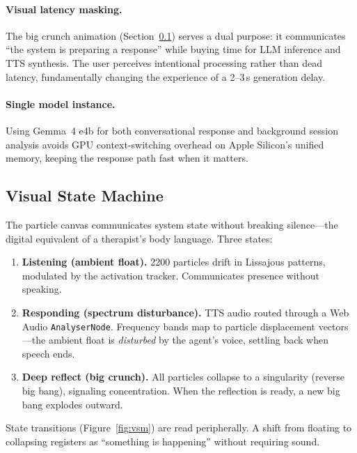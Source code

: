 \documentclass{article}
\begin{document}
\paragraph{Visual latency masking.} The big crunch animation (Section~\ref{sec:vsm}) serves a dual purpose: it communicates ``the system is preparing a response'' while buying time for LLM inference and TTS synthesis. The user perceives intentional processing rather than dead latency, fundamentally changing the experience of a 2--3\,s generation delay.

\paragraph{Single model instance.} Using Gemma~4 e4b for both conversational response and background session analysis avoids GPU context-switching overhead on Apple Silicon's unified memory, keeping the response path fast when it matters.

\subsection{Visual State Machine}
\label{sec:vsm}

The particle canvas communicates system state without breaking silence---the digital equivalent of a therapist's body language. Three states:

\begin{enumerate}
\item \textbf{Listening (ambient float).} 2200 particles drift in Lissajous patterns, modulated by the activation tracker. Communicates presence without speaking.
\item \textbf{Responding (spectrum disturbance).} TTS audio routed through a Web Audio \texttt{AnalyserNode}. Frequency bands map to particle displacement vectors---the ambient float is \emph{disturbed} by the agent's voice, settling back when speech ends.
\item \textbf{Deep reflect (big crunch).} All particles collapse to a singularity (reverse big bang), signaling concentration. When the reflection is ready, a new big bang explodes outward.
\end{enumerate}

State transitions (Figure~\ref{fig:vsm}) are read peripherally. A shift from floating to collapsing registers as ``something is happening'' without requiring sound.
\end{document}
